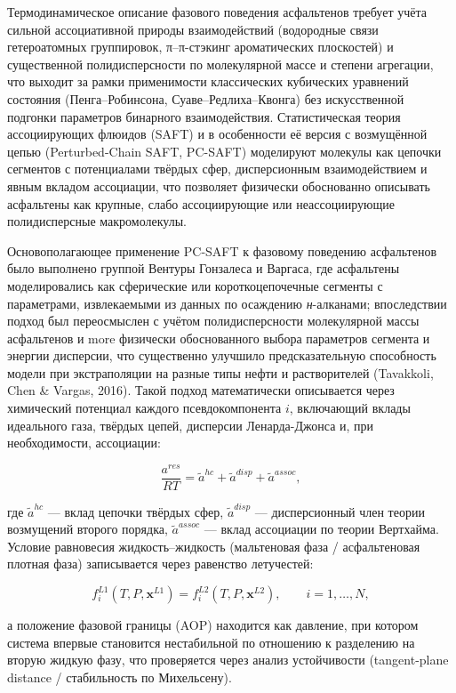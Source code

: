 \documentclass[11pt]{extarticle}
\begin{document}
Термодинамическое описание фазового поведения асфальтенов требует учёта сильной ассоциативной природы взаимодействий (водородные связи гетероатомных группировок, π--π-стэкинг ароматических плоскостей) и существенной полидисперсности по молекулярной массе и степени агрегации, что выходит за рамки применимости классических кубических уравнений состояния (Пенга--Робинсона, Суаве--Редлиха--Квонга) без искусственной подгонки параметров бинарного взаимодействия. Статистическая теория ассоциирующих флюидов (SAFT) и в особенности её версия с возмущённой цепью (Perturbed-Chain SAFT, PC-SAFT) моделируют молекулы как цепочки сегментов с потенциалами твёрдых сфер, дисперсионным взаимодействием и явным вкладом ассоциации, что позволяет физически обоснованно описывать асфальтены как крупные, слабо ассоциирующие или неассоциирующие полидисперсные макромолекулы.

Основополагающее применение PC-SAFT к фазовому поведению асфальтенов было выполнено группой Вентуры Гонзалеса и Варгаса, где асфальтены моделировались как сферические или короткоцепочечные сегменты с параметрами, извлекаемыми из данных по осаждению \emph{н}-алканами; впоследствии подход был переосмыслен с учётом полидисперсности молекулярной массы асфальтенов и more физически обоснованного выбора параметров сегмента и энергии дисперсии, что существенно улучшило предсказательную способность модели при экстраполяции на разные типы нефти и растворителей (Tavakkoli, Chen \& Vargas, 2016). Такой подход математически описывается через химический потенциал каждого псевдокомпонента \(i\), включающий вклады идеального газа, твёрдых цепей, дисперсии Ленарда-Джонса и, при необходимости, ассоциации:

\[
\frac{a^{res}}{RT} = \tilde a^{hc} + \tilde a^{disp} + \tilde a^{assoc},
\]

где \(\tilde a^{hc}\) --- вклад цепочки твёрдых сфер, \(\tilde a^{disp}\) --- дисперсионный член теории возмущений второго порядка, \(\tilde a^{assoc}\) --- вклад ассоциации по теории Вертхайма. Условие равновесия жидкость--жидкость (мальтеновая фаза / асфальтеновая плотная фаза) записывается через равенство летучестей:

\[
f_i^{L1}(T,P,\mathbf{x}^{L1}) = f_i^{L2}(T,P,\mathbf{x}^{L2}), \qquad i=1,\dots,N,
\]

а положение фазовой границы (AOP) находится как давление, при котором система впервые становится нестабильной по отношению к разделению на вторую жидкую фазу, что проверяется через анализ устойчивости (tangent-plane distance / стабильность по Михельсену).
\end{document}
